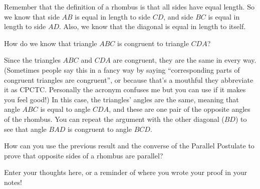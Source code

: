 \documentclass{ximera}
\begin{document}
\begin{example}
\begin{image}
\end{image}
Remember that the definition of a rhombus is that all sides have equal length. So we know that side $AB$ is equal in length to side $CD$, and side $BC$ is equal in length to side $AD$. Also, we know that the diagonal is equal in length to itself.
\begin{question}
How do we know that triangle $ABC$ is congruent to triangle $CDA$?
\begin{multipleChoice}
\end{multipleChoice}
\end{question}
Since the triangles $ABC$ and $CDA$ are congruent, they are the same in every way. (Sometimes people say this in a fancy way by saying ``corresponding parts of congruent triangles are congruent'', or because that's a mouthful they abbreviate it as CPCTC. Personally the acronym confuses me but you can use if it makes you feel good!) In this case, the triangles' angles are the same, meaning that angle $ABC$ is equal to angle $CDA$, and these are one pair of the opposite angles of the rhombus. You can repeat the argument with the other diagonal ($BD$) to see that angle $BAD$ is congruent to angle $BCD$.

\end{example}


\begin{question}
How can you use the previous result and the converse of the Parallel Postulate to prove that opposite sides of a rhombus are parallel?
\begin{freeResponse}
Enter your thoughts here, or a reminder of where you wrote your proof in your notes!
\end{freeResponse}
\end{question}
\end{document}

